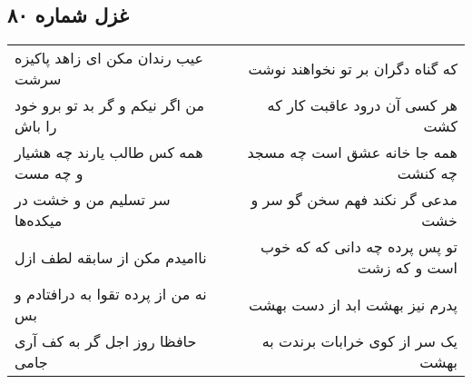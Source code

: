 \begin{center}
\section*{غزل شماره ۸۰}
\label{sec:sh080}
\begin{longtable}{l p{0.5cm} r}
عیب رندان مکن ای زاهد پاکیزه سرشت
&&
که گناه دگران بر تو نخواهند نوشت
\\
من اگر نیکم و گر بد تو برو خود را باش
&&
هر کسی آن درود عاقبت کار که کشت
\\
همه کس طالب یارند چه هشیار و چه مست
&&
همه جا خانه عشق است چه مسجد چه کنشت
\\
سر تسلیم من و خشت در میکده‌ها
&&
مدعی گر نکند فهم سخن گو سر و خشت
\\
ناامیدم مکن از سابقه لطف ازل
&&
تو پس پرده چه دانی که که خوب است و که زشت
\\
نه من از پرده تقوا به درافتادم و بس
&&
پدرم نیز بهشت ابد از دست بهشت
\\
حافظا روز اجل گر به کف آری جامی
&&
یک سر از کوی خرابات برندت به بهشت
\\
\end{longtable}
\end{center}
